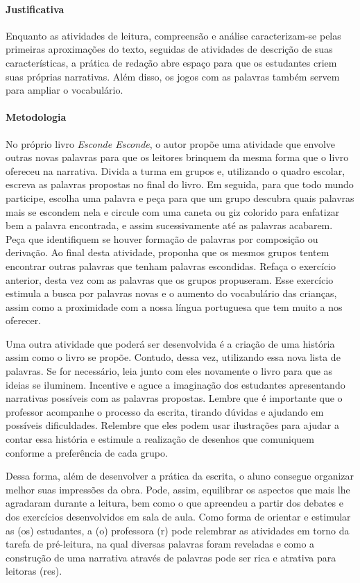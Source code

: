 \documentclass[11pt]{extarticle}
\begin{document}
\paragraph{Justificativa} Enquanto as atividades de leitura, compreensão e análise caracterizam-se pelas primeiras aproximações do texto, seguidas de atividades de descrição de suas características, a prática de redação abre espaço para que os estudantes criem suas próprias narrativas. Além disso, os jogos com as palavras também servem para ampliar o vocabulário. 

\paragraph{Metodologia} No próprio livro \textit{Esconde Esconde}, o autor propõe uma atividade que envolve outras novas palavras para que os leitores brinquem da mesma forma que o livro ofereceu na narrativa. Divida a turma em grupos e, utilizando o quadro escolar, escreva as palavras propostas no final do livro. Em seguida, para que todo mundo participe, escolha uma palavra e peça para que um grupo descubra quais palavras mais se escondem nela e circule com uma caneta ou giz colorido para enfatizar bem a palavra encontrada, e assim sucessivamente até as palavras acabarem. Peça que identifiquem se houver formação de palavras por composição ou derivação. Ao final desta atividade, proponha que os mesmos grupos tentem encontrar outras palavras que tenham palavras escondidas. Refaça o exercício anterior, desta vez com as palavras que os grupos propuseram. Esse exercício estimula a busca por palavras novas e o aumento do vocabulário das crianças, assim como a proximidade com a nossa língua portuguesa que tem muito a nos oferecer.

Uma outra atividade que poderá ser desenvolvida é a criação de uma história assim como o livro se propõe. Contudo, dessa vez, utilizando essa nova lista de palavras. Se for necessário, leia junto com eles novamente o livro para que as ideias se iluminem. Incentive e aguce a imaginação dos estudantes apresentando narrativas possíveis com as palavras propostas. Lembre que é importante que o professor acompanhe o processo da escrita, tirando dúvidas e ajudando em possíveis dificuldades. Relembre que eles podem usar ilustrações para ajudar a contar essa história e estimule a realização de desenhos que comuniquem conforme a preferência de cada grupo.

Dessa forma, além de desenvolver a prática da escrita, o aluno consegue organizar melhor suas impressões da obra. Pode, assim, equilibrar os aspectos que mais lhe agradaram durante a leitura, bem como o que apreendeu a partir dos debates e dos exercícios desenvolvidos em sala de aula. Como forma de orientar e estimular as (os) estudantes, a (o) professora (r) pode relembrar as atividades em torno da tarefa de pré-leitura, na qual diversas palavras foram reveladas e como a construção de uma narrativa através de palavras pode ser rica e atrativa para leitoras (res).
\end{document}
